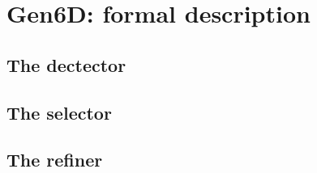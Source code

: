 
\chapter{Gen6D: formal description}\label{chapter:gen6d_formal_description}

\section{The dectector}
\section{The selector}
\section{The refiner}